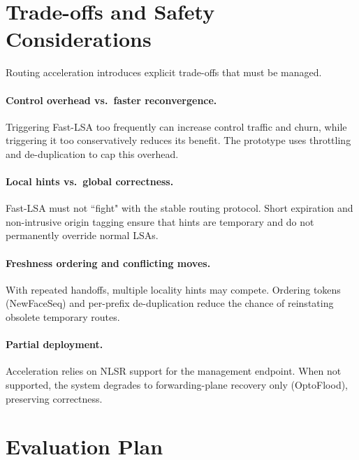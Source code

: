 
\section{Trade-offs and Safety Considerations}
\label{sec:routing_acceleration:trade-offs_and_safety_considerations}

Routing acceleration introduces explicit trade-offs that must be managed.

\paragraph{Control overhead vs.\ faster reconvergence.}
Triggering Fast-LSA too frequently can increase control traffic and churn, while triggering it too conservatively reduces its benefit. The prototype uses throttling and de-duplication to cap this overhead.

\paragraph{Local hints vs.\ global correctness.}
Fast-LSA must not “fight" with the stable routing protocol. Short expiration and non-intrusive origin tagging ensure that hints are temporary and do not permanently override normal LSAs.

\paragraph{Freshness ordering and conflicting moves.}
With repeated handoffs, multiple locality hints may compete. Ordering tokens (NewFaceSeq) and per-prefix de-duplication reduce the chance of reinstating obsolete temporary routes.

\paragraph{Partial deployment.}
Acceleration relies on NLSR support for the management endpoint. When not supported, the system degrades to forwarding-plane recovery only (OptoFlood), preserving correctness.


\section{Evaluation Plan}
\label{sec:routing_acceleration:evaluation_plan}

